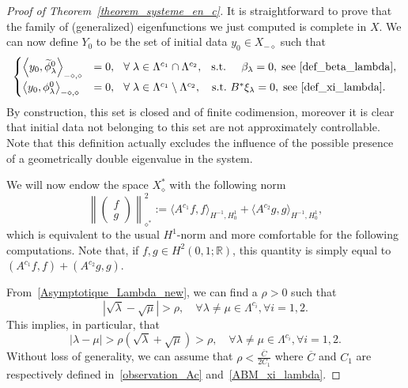 \documentclass[10pt]{amsart}
\theoremstyle{definition}\newtheorem{defi}[theo]{Definition}\newtheorem{rema}[theo]{Remark}\newtheorem{exam}[theo]{Example}\newtheorem{exem}[theo]{Example}\newtheorem{nota}[theo]{Notation}
\newcommand{\Xalphas}{X_\diamond^*}
\newcommand{\Xmalpha}{X_{-\diamond}}
\newcommand{\Fzp}{Y_0}
\newcommand{\normeXalphas}[1]{\left\| #1 \right\|_{\diamond^*}}
\newcommand{\dual}[2]{\left\langle #1, #2 \right\rangle_{-\diamond,\diamond}}
\newcommand{\R}{\mathbb{R}}
\let\oldtilde\tilde
\renewcommand*{\tilde}[1]{\mathchoice{\widetilde{#1}}{\widetilde{#1}}{\oldtilde{#1}}{\oldtilde{#1}}}\let\oldexists\exists
\renewcommand*{\exists}{\mathrel{\oldexists}}
\let\oldforall\forall
\renewcommand*{\forall}{\mathrel{\oldforall}}
\begin{document}
\begin{proof}[Proof of Theorem~\ref{theorem_systeme_en_c}]
It is straightforward to prove that the family of (generalized) eigenfunctions we just computed is complete in $X$. We can now define $\Fzp$ to be the set of initial data $y_0\in \Xmalpha$ such that
\begin{equation}\label{conditions_Y0}
\begin{cases}
\dual{y_0}{\tilde{\phi}^0_\lambda} & = 0, \mkern13mu \forall \lambda\in \Lambda^{c_1}\cap \Lambda^{c_2}, \mkern14mu\text{s.t.} \mkern25mu \beta_\lambda=0, \; \text{see~\eqref{def_beta_lambda}},\\[0.15em] 
\dual{y_0}{\phi_\lambda^0} & = 0, \ \mkern7mu \forall \lambda\in \Lambda^{c_1}\setminus \Lambda^{c_2}, \quad\text{s.t.} \ B^* \xi_\lambda=0, \; \text{see~\eqref{def_xi_lambda}}.
\end{cases}
\end{equation}
By construction, this set is closed and of finite codimension, moreover it is clear that initial data not belonging to this set are not approximately controllable. Note that this definition actually excludes the influence of the possible presence of a geometrically double eigenvalue in the system.



We will now endow the space $\Xalphas$ with the following norm
\[
\normeXalphas{
\begin{pmatrix} f \\ g
\end{pmatrix}}^2 := \langle A^{c_1} f,f\rangle_{H^{-1},H^1_0} + \langle A^{c_2} g,g\rangle_{H^{-1},H^1_0},
\]
which is equivalent to the usual $H^1$-norm and more comfortable for the following computations. Note that, if $f,g\in H^2(0,1 ; \R)$, this quantity is simply equal to $(A^{c_1} f,f) + (A^{c_2}g,g)$.


From~\eqref{Asymptotique_Lambda_new}, we can find a $\rho>0$ such that
\[
\left|\sqrt{\lambda}-\sqrt{\mu}\right| > \rho, \quad\forall \lambda\neq \mu \in \Lambda^{c_i}, \forall i=1,2.
\]
This implies, in particular, that
\begin{equation}\label{gap_potentiel}
|\lambda-\mu| > \rho \left(\sqrt{\lambda}+\sqrt{\mu}\right) > \rho, \quad \forall \lambda\neq \mu \in \Lambda^{c_i}, \forall i=1,2.
\end{equation}
Without loss of generality, we can assume that $\rho < \frac{\overline{C}}{2 C_1}$ where $\overline{C}$ and $C_1$ are respectively defined in~\eqref{observation_Ac} and~\eqref{ABM_xi_lambda}.


\end{proof}
\end{document}
